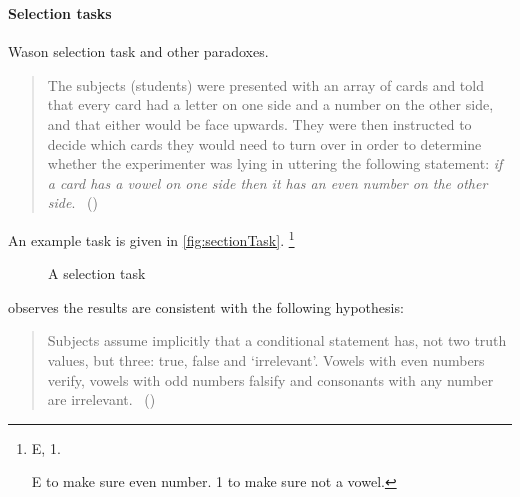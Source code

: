 \subsubsection{}
\label{sec:illu3-1}

\paragraph*{Selection tasks}
\nocite{Wason:1968aa}
\nocite{wason1971natural}

\begin{note}
  Wason selection task and other paradoxes.

  \begin{quote}
    The subjects (students) were presented with an array of cards and told that every card had a letter on one side and a number on the other side, and that either would be face upwards.
    They were then instructed to decide which cards they would need to turn over in order to determine whether the experimenter was lying in uttering the following statement:
    \emph{if a card has a vowel on one side then it has an even number on the other side}.%
    \mbox{ }\hfill\mbox{(\citeyear[145--146]{Wason:1966aa})}
  \end{quote}

  An example task is given in \autoref{fig:sectionTask}.%
  \footnote{
    E, 1.

    E to make sure even number.
    1 to make sure not a vowel.
  }

  \begin{figure}[H]
    \centering
    \caption{A selection task}
    \label{fig:sectionTask}
  \end{figure}

  \citeauthor{Wason:1966aa} observes the results are consistent with the following hypothesis:
  \begin{quote}
    Subjects assume implicitly that a conditional statement has, not two truth values, but three: true, false and `irrelevant'.
    Vowels with even numbers verify, vowels with odd numbers falsify and consonants with any number are irrelevant.%
    \mbox{ }\hfill\mbox{(\citeyear[146]{Wason:1966aa})}
  \end{quote}


\end{note}
